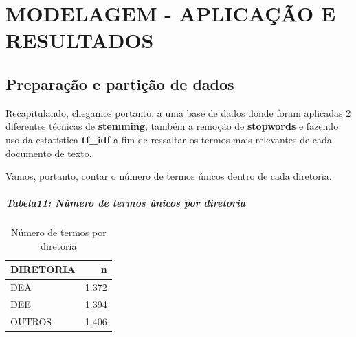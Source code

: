 \documentclass[]{article}
\newenvironment{Shaded}{\begin{snugshade}}{\end{snugshade}}
\newcommand{\KeywordTok}[1]{\textcolor[rgb]{0.13,0.29,0.53}{\textbf{#1}}}
\newcommand{\DataTypeTok}[1]{\textcolor[rgb]{0.13,0.29,0.53}{#1}}
\newcommand{\StringTok}[1]{\textcolor[rgb]{0.31,0.60,0.02}{#1}}
\newcommand{\OperatorTok}[1]{\textcolor[rgb]{0.81,0.36,0.00}{\textbf{#1}}}
\newcommand{\NormalTok}[1]{#1}
\let\oldsubparagraph\subparagraph
\renewcommand{\subparagraph}[1]{\oldsubparagraph{#1}\mbox{}}
\begin{document}
\section{MODELAGEM - APLICAÇÃO E
RESULTADOS}\label{modelagem---aplicacao-e-resultados}

\subsection{Preparação e partição de
dados}\label{preparacao-e-particao-de-dados}

Recapitulando, chegamos portanto, a uma base de dados donde foram
aplicadas 2 diferentes técnicas de \textbf{stemming}, também a remoção
de \textbf{stopwords} e fazendo uso da estatística \textbf{tf\_idf} a
fim de ressaltar os termos mais relevantes de cada documento de texto.

Vamos, portanto, contar o número de termos únicos dentro de cada
diretoria.

\subparagraph{Tabela11: Número de termos únicos por
diretoria}\label{tabela11-numero-de-termos-unicos-por-diretoria}

\begin{Shaded}
\end{Shaded}

\begin{table}[!h]

\caption{\label{tab:unnamed-chunk-70}Número de termos por diretoria}
\centering
\begin{tabular}{lr}
\toprule
DIRETORIA & n\\
\midrule
\rowcolor{gray!6}  DEA & 1.372\\
DEE & 1.394\\
\rowcolor{gray!6}  OUTROS & 1.406\\
\bottomrule
\end{tabular}
\end{table}
\end{document}
